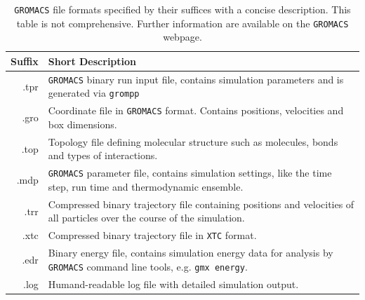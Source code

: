 \documentclass[9pt,tutorial]{livecoms}
\newcommand{\code}[1]{\colorbox{light-gray}{\texttt{#1}}}
\begin{document}
\begin{table}[H]
    \centering
    \caption{\texttt{GROMACS} file formats specified by their suffices with a concise description. This table is not comprehensive. Further information are available on the \texttt{GROMACS} webpage.}
    \label{tab:gromacsFileDesc}
    \begin{tabular}{r p{7cm}}
        \toprule
        Suffix & Short Description \\
        \midrule
        .tpr & \texttt{GROMACS} binary run input file, contains simulation parameters and is generated via \code{grompp} \\
        .gro & Coordinate file in \texttt{GROMACS} format. Contains positions, velocities and box dimensions. \\
        .top & Topology file defining molecular structure such as molecules, bonds and types of interactions.\\
        .mdp & \texttt{GROMACS} parameter file, contains simulation settings, like the time step, run time and thermodynamic ensemble.\\
        .trr & Compressed binary trajectory file containing positions and velocities of all particles over the course of the simulation. \\
        .xtc & Compressed binary trajectory file in \texttt{XTC} format. \\
        .edr & Binary energy file, contains simulation energy data for analysis by \texttt{GROMACS} command line tools, e.g. \code{gmx energy}.\\
        .log & Humand-readable log file with detailed simulation output.\\
    \bottomrule
    \end{tabular}
\end{table}
\end{document}
